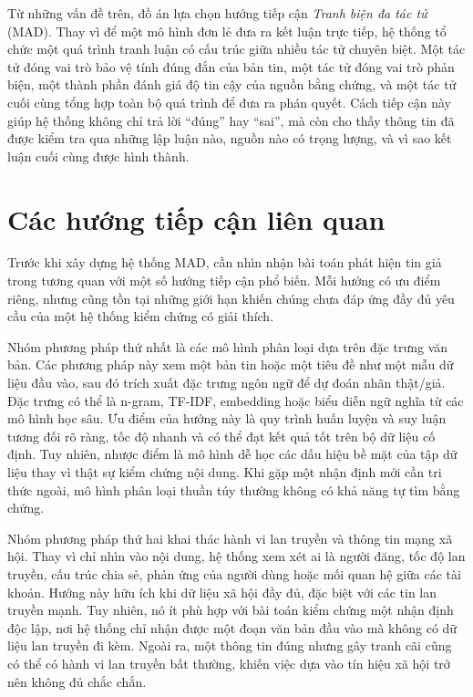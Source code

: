 ﻿\documentclass[oneside,a4paper,12pt]{extreport}
\begin{document}
Từ những vấn đề trên, đồ án lựa chọn hướng tiếp cận \textit{Tranh biện đa tác tử} (MAD). Thay vì để một mô hình đơn lẻ đưa ra kết luận trực tiếp, hệ thống tổ chức một quá trình tranh luận có cấu trúc giữa nhiều tác tử chuyên biệt. Một tác tử đóng vai trò bảo vệ tính đúng đắn của bản tin, một tác tử đóng vai trò phản biện, một thành phần đánh giá độ tin cậy của nguồn bằng chứng, và một tác tử cuối cùng tổng hợp toàn bộ quá trình để đưa ra phán quyết. Cách tiếp cận này giúp hệ thống không chỉ trả lời ``đúng'' hay ``sai'', mà còn cho thấy thông tin đã được kiểm tra qua những lập luận nào, nguồn nào có trọng lượng, và vì sao kết luận cuối cùng được hình thành.

\section{Các hướng tiếp cận liên quan}

Trước khi xây dựng hệ thống MAD, cần nhìn nhận bài toán phát hiện tin giả trong tương quan với một số hướng tiếp cận phổ biến. Mỗi hướng có ưu điểm riêng, nhưng cũng tồn tại những giới hạn khiến chúng chưa đáp ứng đầy đủ yêu cầu của một hệ thống kiểm chứng có giải thích.

Nhóm phương pháp thứ nhất là các mô hình phân loại dựa trên đặc trưng văn bản. Các phương pháp này xem một bản tin hoặc một tiêu đề như một mẫu dữ liệu đầu vào, sau đó trích xuất đặc trưng ngôn ngữ để dự đoán nhãn thật/giả. Đặc trưng có thể là n-gram, TF-IDF, embedding hoặc biểu diễn ngữ nghĩa từ các mô hình học sâu. Ưu điểm của hướng này là quy trình huấn luyện và suy luận tương đối rõ ràng, tốc độ nhanh và có thể đạt kết quả tốt trên bộ dữ liệu cố định. Tuy nhiên, nhược điểm là mô hình dễ học các dấu hiệu bề mặt của tập dữ liệu thay vì thật sự kiểm chứng nội dung. Khi gặp một nhận định mới cần tri thức ngoài, mô hình phân loại thuần túy thường không có khả năng tự tìm bằng chứng.

Nhóm phương pháp thứ hai khai thác hành vi lan truyền và thông tin mạng xã hội. Thay vì chỉ nhìn vào nội dung, hệ thống xem xét ai là người đăng, tốc độ lan truyền, cấu trúc chia sẻ, phản ứng của người dùng hoặc mối quan hệ giữa các tài khoản. Hướng này hữu ích khi dữ liệu xã hội đầy đủ, đặc biệt với các tin lan truyền mạnh. Tuy nhiên, nó ít phù hợp với bài toán kiểm chứng một nhận định độc lập, nơi hệ thống chỉ nhận được một đoạn văn bản đầu vào mà không có dữ liệu lan truyền đi kèm. Ngoài ra, một thông tin đúng nhưng gây tranh cãi cũng có thể có hành vi lan truyền bất thường, khiến việc dựa vào tín hiệu xã hội trở nên không đủ chắc chắn.
\end{document}
